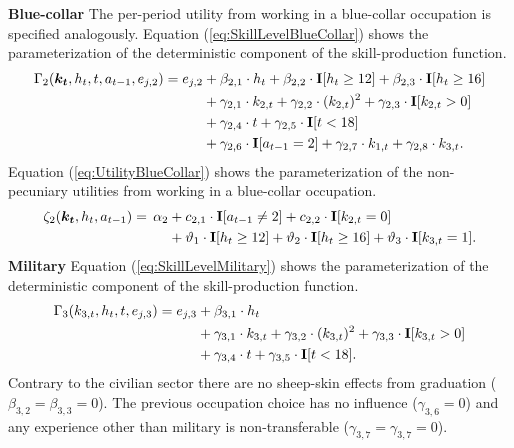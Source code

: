 \noindent\textbf{Blue-collar} The per-period utility from working in a blue-collar occupation is specified analogously. Equation (\ref{eq:SkillLevelBlueCollar}) shows the parameterization of the deterministic component of the skill-production function.
%
\begin{align}\label{eq:SkillLevelBlueCollar}
    \Gamma_2(\bm{k_t}, h_t, t, a_{t-1}, e_{j,2}) = e_{j,2} & + \beta_{2,1} \cdot h_t + \beta_{2, 2} \cdot {\textbf{I}}[h_t \geq 12] + \beta_{2,3} \cdot {\textbf{I}}[h_t\geq 16] \\\nonumber
    							 & + \gamma_{2, 1} \cdot  k_{2,t} + \gamma_{2,2} \cdot  (k_{2,t})^2 + \gamma_{2,3} \cdot  {\textbf{I}}[k_{2,t} > 0] \\\nonumber
                                   & + \gamma_{2,4} \cdot  t + \gamma_{2,5} \cdot {\textbf{I}}[t < 18] \\\nonumber
                                  & + \gamma_{2,6} \cdot  {\textbf{I}}[a_{t-1} = 2]  + \gamma_{2,7} \cdot  k_{1,t} + \gamma_{2,8} \cdot  k_{3,t}.
\end{align}
%
\noindent Equation (\ref{eq:UtilityBlueCollar}) shows the parameterization of the non-pecuniary utilities from working in a blue-collar occupation.
%
\begin{align}\label{eq:UtilityBlueCollar}
\zeta_{2}( \bm{k_t}, h_t, a_{t-1} ) = \,\alpha_2 & + c_{2,1} \cdot {\textbf{I}}[a_{t-1} \neq 2] + c_{2,2} \cdot {\textbf{I}}[k_{2,t} = 0]\\\nonumber
                            & + \vartheta_1 \cdot {\textbf{I}}[h_t \geq 12] + \vartheta_2 \cdot {\textbf{I}}[h_t \geq 16] + \vartheta_3 \cdot {\textbf{I}}[k_{3,t} = 1].
\end{align}
%
\noindent\textbf{Military} Equation (\ref{eq:SkillLevelMilitary}) shows the parameterization of the deterministic component of the skill-production function.
%
\begin{align}\label{eq:SkillLevelMilitary}
    \Gamma_3( k_{3,t}, h_t, t, e_{j,3}) = e_{j,3} & + \beta_{3,1} \cdot h_t \\\nonumber
	               \nonumber &+ \gamma_{3,1} \cdot  k_{3,t} + \gamma_{3,2} \cdot (k_{3,t})^2 + \gamma_{3,3} \cdot {\textbf{I}}[k_{3,t} > 0]\\\nonumber
									 & + \gamma_{3,4} \cdot t + \gamma_{3,5} \cdot {\textbf{I}}[t < 18].
\end{align}
%
Contrary to the civilian sector there are no sheep-skin effects from graduation ($\beta_{3,2} = \beta_{3,3}= 0$). The previous occupation choice has no influence ($\gamma_{3,6}= 0$) and any experience other than military is non-transferable ($\gamma_{3,7} = \gamma_{3,7} = 0$).\\

